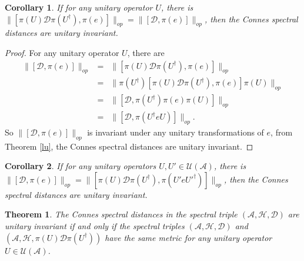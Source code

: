 \documentclass[a4paper,12pt]{article}
\newtheorem{corollary}{Corollary}
\newtheorem{theorem}{Theorem}
\begin{document}
\begin{corollary}
  If for any unitary operator $U$, there is $\|[\pi (U)\mathcal{D} \pi
  (U^{\dag}), \pi (e)]\|_{op} = \|[\mathcal{D}, \pi (e)]\|_{op}$, then the
  Connes spectral distances are unitary invariant.
\end{corollary}

\begin{proof}
For any unitary operator $U$, there are
\begin{eqnarray}
  \|[\mathcal{D}, \pi (e)]\|_{op} & = & \|[\pi (U)\mathcal{D} \pi (U^{\dag}),
  \pi (e)]\|_{op} \nonumber\\
  & = & \| \pi (U^{\dag}) [\pi (U)\mathcal{D} \pi (U^{\dag}), \pi (e)] \pi
  (U)\|_{op} \nonumber\\
  & = & \|[\mathcal{D}, \pi (U^{\dag}) \pi (e) \pi (U)]\|_{op} \nonumber\\
  & = & \|[\mathcal{D}, \pi (U^{\dag} eU)]\|_{op} . 
\end{eqnarray}
So $\|[\mathcal{D}, \pi (e)]\|_{op}$ is invariant under any unitary
transformations of $e$, from Theorem \ref{lu}, the Connes spectral distances are unitary
invariant.
\end{proof}

\begin{corollary}
  If for any unitary operators $U, U' \in \mathcal{U} (\mathcal{A})$, there is
  $\|[\mathcal{D}, \pi (e)]\|_{op} = \|[\pi (U)\mathcal{D} \pi (U^{\dag}), \pi
  (U' {eU'}^{\dag})]\|_{op}$, then the Connes spectral distances are unitary
  invariant.
\end{corollary}


\begin{theorem}
  \label{udu}The Connes spectral distances in the spectral triple
  $(\mathcal{A}, \mathcal{H}, \mathcal{D})$ are unitary invariant if and only
  if the spectral triples $(\mathcal{A}, \mathcal{H}, \mathcal{D})$ and
  $(\mathcal{A}, \mathcal{H}, \pi (U)\mathcal{D} \pi (U^{\dag}))$ have the
  same metric for any unitary operator $U \in \mathcal{U} (\mathcal{A})$.
\end{theorem}
\end{document}
